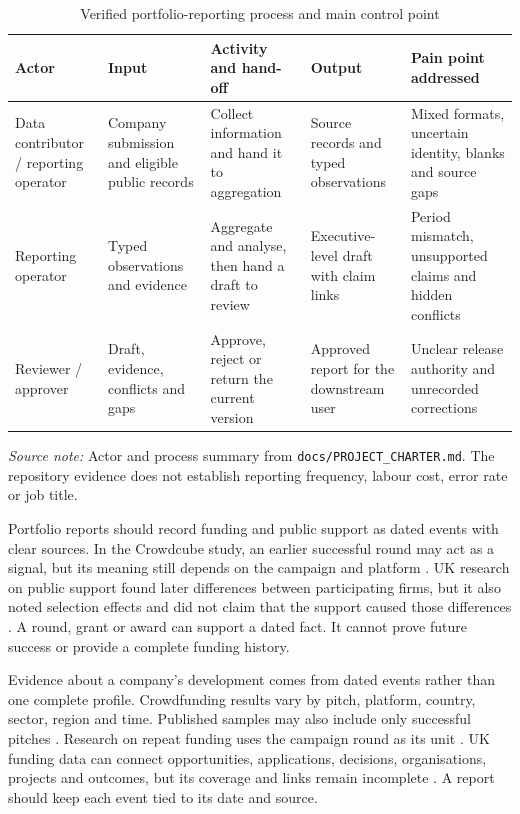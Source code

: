 \begin{table}[htbp]
  \centering
  \small
  \setlength{\tabcolsep}{4pt}
  \renewcommand{\arraystretch}{1.12}
  \begin{tabularx}{\textwidth}{@{}P{0.15\textwidth}P{0.17\textwidth}P{0.19\textwidth}P{0.16\textwidth}Y@{}}
    \toprule
    \textbf{Actor} & \textbf{Input} & \textbf{Activity and hand-off} & \textbf{Output} & \textbf{Pain point addressed} \\
    \midrule
    Data contributor / reporting operator & Company submission and eligible public records & Collect information and hand it to aggregation & Source records and typed observations & Mixed formats, uncertain identity, blanks and source gaps \\
    Reporting operator & Typed observations and evidence & Aggregate and analyse, then hand a draft to review & Executive-level draft with claim links & Period mismatch, unsupported claims and hidden conflicts \\
    Reviewer / approver & Draft, evidence, conflicts and gaps & Approve, reject or return the current version & Approved report for the downstream user & Unclear release authority and unrecorded corrections \\
    \bottomrule
  \end{tabularx}

  \caption{Verified portfolio-reporting process and main control point}
  \label{tab:intro-business-process}
  \vspace{3pt}

  \parbox{\textwidth}{\scriptsize
    \textit{Source note:} Actor and process summary from \texttt{docs/PROJECT\_CHARTER.md}. The
    repository evidence does not establish reporting frequency, labour cost, error rate or job title.}
\end{table}

Portfolio reports should record funding and public support as dated events with clear sources. In the
Crowdcube study, an earlier successful round may act as a signal, but its meaning still depends on the
campaign and platform \citep{wasti2024successive}. UK research on public support found later
differences between participating firms, but it also noted selection effects and did not claim that
the support caused those differences \citep{mondal2025state,thorne2026funding}. A round, grant or
award can support a dated fact. It cannot prove future success or provide a complete funding history.

Evidence about a company's development comes from dated events rather than one complete profile.
Crowdfunding results vary by pitch, platform, country, sector, region and time. Published samples may
also include only successful pitches \citep{estrin2024digital}. Research on repeat funding uses the
campaign round as its unit \citep{wasti2024successive}. UK funding data can connect opportunities,
applications, decisions, organisations, projects and outcomes, but its coverage and links remain
incomplete \citep{thorne2026funding}. A report should keep each event tied to its date and source.

